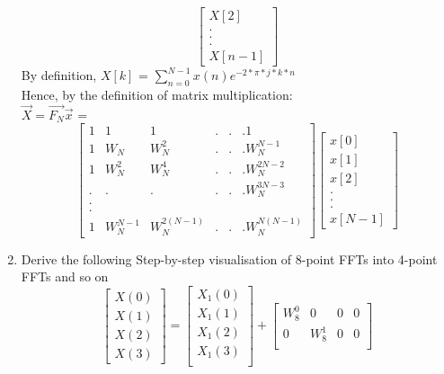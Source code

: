 \documentclass[journal,12pt,twocolumn]{IEEEtran}
\renewcommand\thesection{\arabic{section}}
\begin{document}
\begin{enumerate}[label=\arabic*.,ref=\thesection.\theenumi]
\begin{solution}
\begin{equation}
\begin{bmatrix}
		X[2] \\
		. \\
		. \\
		. \\
		X[n-1]
	\end{bmatrix}
\end{equation}
By definition, $X[k]$ = $\sum_{n=0}^{N-1}x(n)e^{-2*\pi*j*k*n}$
\\Hence, by the definition of matrix multiplication:
\\$\vec{X} = \vec{F_{N}}\vec{x}$ =
\begin{equation}
	\begin{bmatrix}
		1 & 1 & 1 & . & . & . 1 \\
		1 & W_N & W_N^{2} & . & . &. W_N^{N-1}\\
		1 & W_N^{2} & W_N^{4} & . & . &. W_N^{2N-2} \\
		. & . & . & . & . &. W_N^{3N-3}\\
		. \\
		. \\
		1 & W_N^{N-1} & W_N^{2(N-1)} & . & . &. W_N^{N(N-1)}
	\end{bmatrix}
	\begin{bmatrix}
		x[0] \\
		x[1] \\
		x[2] \\
		. \\
		. \\
		. \\
		x[N-1]
	\end{bmatrix}
\end{equation}
\end{solution}
\item Derive the following Step-by-step visualisation  of
8-point FFTs into 4-point FFTs and so on
\begin{equation}
\begin{bmatrix}
X(0) \\ 
X(1) \\ 
X(2) \\ 
X(3)
\end{bmatrix}
=
\begin{bmatrix}
X_{1}(0) \\ 
X_{1}(1)\\ 
X_{1}(2)\\
X_{1}(3)\\
\end{bmatrix}
+
\begin{bmatrix}
W^{0}_{8} & 0 & 0 & 0\\
0 & W^{1}_{8} & 0 & 0\\

\end{bmatrix}
\end{equation}
\end{enumerate}
\end{document}
